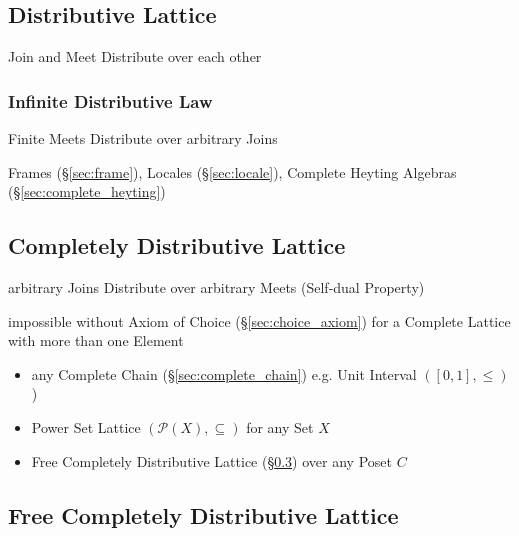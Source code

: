\subsection{Distributive Lattice}\label{sec:distributive_lattice}

Join and Meet Distribute over each other



\subsubsection{Infinite Distributive Law}
\label{sec:infinite_distributive}

Finite Meets Distribute over arbitrary Joins

Frames (\S\ref{sec:frame}), Locales (\S\ref{sec:locale}), Complete
Heyting Algebras (\S\ref{sec:complete_heyting})



\subsection{Completely Distributive Lattice}
\label{sec:completely_distributive}

arbitrary Joins Distribute over arbitrary Meets (Self-dual Property)

impossible without Axiom of Choice (\S\ref{sec:choice_axiom}) for a
Complete Lattice with more than one Element

\begin{itemize}
  \item any Complete Chain (\S\ref{sec:complete_chain}) e.g. Unit
    Interval $([0,1], \leq)$)
  \item Power Set Lattice $(\mathcal{P}(X), \subseteq)$ for any Set
    $X$
  \item Free Completely Distributive Lattice
    (\S\ref{sec:free_completely_distributive_lattice}) over any Poset
    $C$
\end{itemize}



\subsection{Free Completely Distributive Lattice}
\label{sec:free_completely_distributive_lattice}

